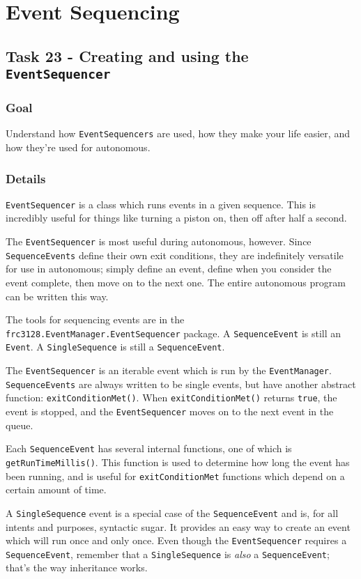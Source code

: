 \documentclass[a4paper]{article}
\begin{document}
\section{Event Sequencing}

\subsection{Task 23 - Creating and using the \lstinline{EventSequencer}}
\subsubsection{Goal} Understand how \lstinline{EventSequencers} are used, how they make your life easier, and how they're used for autonomous.
\subsubsection{Details} \lstinline{EventSequencer} is a class which runs events in a given sequence. This is incredibly useful for things like turning a piston on, then off after half a second.

The \lstinline{EventSequencer} is most useful during autonomous, however. Since \lstinline{SequenceEvents} define their own exit conditions, they are indefinitely versatile for use in autonomous; simply define an event, define when you consider the event complete, then move on to the next one. The entire autonomous program can be written this way. 

The tools for sequencing events are in the \lstinline{frc3128.EventManager.EventSequencer} package. A \lstinline{SequenceEvent} is still an \lstinline{Event}. A \lstinline{SingleSequence} is still a \lstinline{SequenceEvent}.

The \lstinline{EventSequencer} is an iterable event which is run by the \lstinline{EventManager}. \lstinline{SequenceEvents} are always written to be single events, but have another abstract function: \lstinline{exitConditionMet()}. When \lstinline{exitConditionMet()} returns \lstinline{true}, the event is stopped, and the \lstinline{EventSequencer} moves on to the next event in the queue.

Each \lstinline{SequenceEvent} has several internal functions, one of which is \lstinline{getRunTimeMillis()}. This function is used to determine how long the event has been running, and is useful for \lstinline{exitConditionMet} functions which depend on a certain amount of time.

A \lstinline{SingleSequence} event is a special case of the \lstinline{SequenceEvent} and is, for all intents and purposes, syntactic sugar. It provides an easy way to create an event which will run once and only once. Even though the \lstinline{EventSequencer} requires a \lstinline{SequenceEvent}, remember that a \lstinline{SingleSequence} is \textit{also} a \lstinline{SequenceEvent}; that's the way inheritance works.
\end{document}
